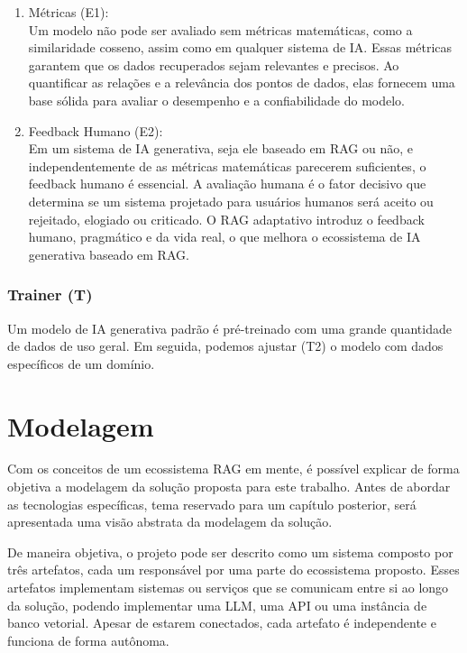\documentclass[a4paper, 12pt]{article}
\begin{document}
    \begin{enumerate}
        \item Métricas (E1):\\
        Um modelo não pode ser avaliado sem métricas matemáticas, como a similaridade cosseno, assim como em qualquer sistema de IA. Essas métricas garantem que os dados recuperados sejam relevantes e precisos. Ao quantificar as relações e a relevância dos pontos de dados, elas fornecem uma base sólida para avaliar o desempenho e a confiabilidade do modelo.
        \item Feedback Humano (E2):\\
        Em um sistema de IA generativa, seja ele baseado em RAG ou não, e independentemente de as métricas matemáticas parecerem suficientes, o feedback humano é essencial. A avaliação humana é o fator decisivo que determina se um sistema projetado para usuários humanos será aceito ou rejeitado, elogiado ou criticado. O RAG adaptativo introduz o feedback humano, pragmático e da vida real, o que melhora o ecossistema de IA generativa baseado em RAG.
    \end{enumerate}
    
    \subsubsection{Trainer (T)}

    Um modelo de IA generativa padrão é pré-treinado com uma grande quantidade de dados de uso geral. Em seguida, podemos ajustar (T2) o modelo com dados específicos de um domínio.

    \clearpage

    \section{Modelagem}

    Com os conceitos de um ecossistema RAG em mente, é possível explicar de forma objetiva a modelagem da solução proposta para este trabalho. Antes de abordar as tecnologias específicas, tema reservado para um capítulo posterior, será apresentada uma visão abstrata da modelagem da solução.

    De maneira objetiva, o projeto pode ser descrito como um sistema composto por três artefatos, cada um responsável por uma parte do ecossistema proposto. Esses artefatos implementam sistemas ou serviços que se comunicam entre si ao longo da solução, podendo implementar uma LLM, uma API ou uma instância de banco vetorial. Apesar de estarem conectados, cada artefato é independente e funciona de forma autônoma.
    
\end{document}
